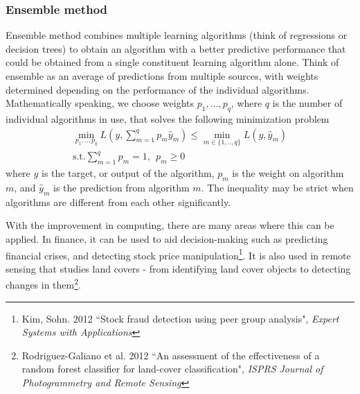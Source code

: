 \documentclass[12pt]{article}
\theoremstyle{definition}
\theoremstyle{property}
\theoremstyle{assumption}
\theoremstyle{example}
\theoremstyle{comment}
\begin{document}
\subsubsection{Ensemble method}
Ensemble method combines multiple learning algorithms (think of regressions or decision trees) to obtain an algorithm with a better predictive performance that could be obtained from a single constituent learning algorithm alone. Think of ensemble as an average of predictions from multiple sources, with weights determined depending on the performance of the individual algorithms. Mathematically speaking, we choose weights $p_1,...,p_q$, where $q$ is the number of individual algorithms in use, that solves the following minimization problem 
\begin{gather*}
\min_{p_1,..,p_q}L\left( y, \sum_{m=1}^q p_m\hat{y}_m\right) \leq \min_{m\in\{1,..,q\}}L(y,\hat{y}_m)\\
\text{s.t.} \sum_{m=1}^q p_m=1, \ \ p_m\geq0
\end{gather*}
where $y$ is the target, or output of the algorithm, $p_m$ is the weight on algorithm $m$, and $\hat{y}_m$ is the prediction from algorithm $m$. The inequality may be strict when algorithms are different from each other significantly. 
\par
With the improvement in computing, there are many areas where this can be applied. In finance, it can be used to aid decision-making such as predicting financial crises, and detecting stock price manipulation\footnote{Kim, Sohn. 2012 ``Stock fraud detection using peer group analysis", \textit{Expert Systems with Applications}}. It is also used in remote sensing that studies land covers - from identifying land cover objects to detecting changes in them\footnote{Rodriguez-Galiano et al. 2012 ``An assessment of the effectiveness of a random forest classifier for land-cover classification", \textit{ISPRS Journal of Photogrammetry and Remote Sensing}}.
\end{document}
